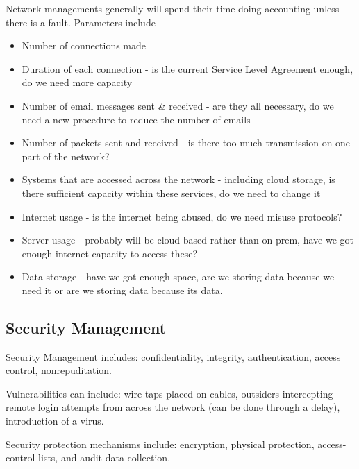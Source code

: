 Network managements generally will spend their time doing accounting unless there is a fault. Parameters include 
\begin{itemize}
    \item Number of connections made
    \item Duration of each connection - is the current Service Level Agreement enough, do we need more capacity
    \item Number of email messages sent \& received - are they all necessary, do we need a new procedure to reduce the number of emails
    \item Number of packets sent and received - is there too much transmission on one part of the network?
    \item Systems that are accessed across the network - including cloud storage, is there sufficient capacity within these services, do we need to change it
    \item Internet usage - is the internet being abused, do we need misuse protocols?
    \item Server usage - probably will be cloud based rather than on-prem, have we got enough internet capacity to access these?
    \item Data storage - have we got enough space, are we storing data because we need it or are we storing data because its data. 
\end{itemize}

\subsection*{Security Management}
Security Management includes: confidentiality, integrity, authentication, access control, nonrepuditation.

Vulnerabilities can include: wire-taps placed on cables, outsiders intercepting remote login attempts from across the network (can be done through a delay), introduction of a virus.

Security protection mechanisms include: encryption, physical protection, access-control lists, and audit data collection. 